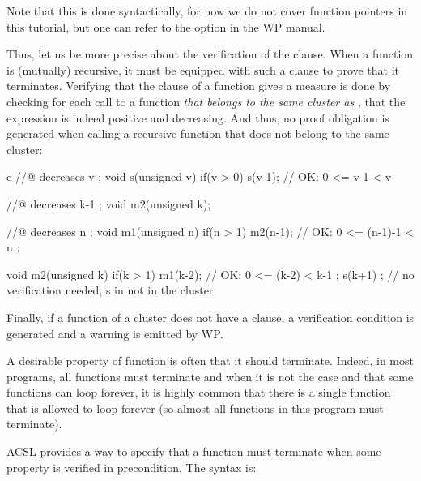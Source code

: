 \begin{Information}
  Note that this is done syntactically, for now we do not cover function
  pointers in this tutorial, but one can refer to the option
   in the WP manual.
\end{Information}


Thus, let us be more precise about the verification of the 
clause. When a function is (mutually) recursive, it must be equipped with such
a clause to prove that it terminates. Verifying that the 
clause of a function  gives a measure is done by checking for each
call to a function {\em that belongs to the same cluster as },
that the expression is indeed positive and decreasing. And thus, no proof
obligation is generated when calling a recursive function that does not belong
to the same cluster:


\begin{CodeBlock}{c}
//@ decreases v ;
void s(unsigned v){
  if(v > 0) s(v-1); // OK: 0 <= v-1 < v
}

//@ decreases k-1 ;
void m2(unsigned k);

//@ decreases n ;
void m1(unsigned n){
  if(n > 1) m2(n-1); // OK: 0 <= (n-1)-1 < n ;
}

void m2(unsigned k){
  if(k > 1) m1(k-2); // OK: 0 <= (k-2) < k-1 ;
  s(k+1) ; // no verification needed, s in not in the cluster
}
\end{CodeBlock}


Finally, if a function of a cluster does not have a 
clause, a  verification condition is generated
and a warning is emitted by WP.





A desirable property of function is often that it should terminate. Indeed, in
most programs, all functions must terminate and when it is not the case and that
some functions can loop forever, it is highly common that there is a single
function that is allowed to loop forever (so almost all functions in this
program must terminate).






ACSL provides a way to specify that a function must terminate when some property
is verified in precondition. The syntax is:



